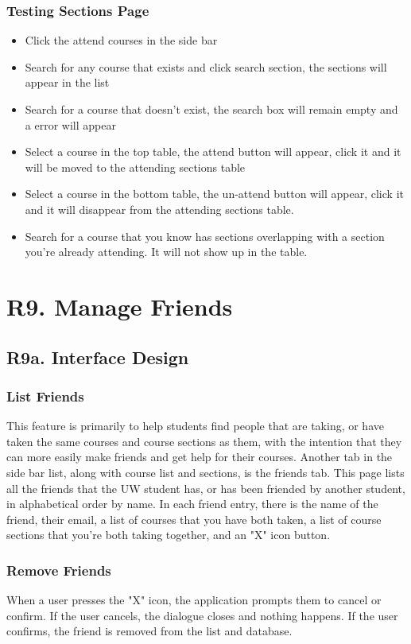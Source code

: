 \documentclass[12pt, a4paper]{article}
\begin{document}
\subsubsection*{Testing Sections Page}
\begin{itemize}
    \item Click the attend courses in the side bar
    \item Search for any course that exists and click search section, the sections will appear in the list
    \item Search for a course that doesn't exist, the search box will remain empty and a error will appear
    \item Select a course in the top table, the attend button will appear, click it and it will be moved to the attending sections table
    \item Select a course in the bottom table, the un-attend button will appear, click it and it will disappear from the attending sections table.
    \item Search for a course that you know has sections overlapping with a section you're already attending. It will not show up in the table.
\end{itemize}
\section*{R9. Manage Friends}
\label{sec:R9}
\subsection*{R9a. Interface Design}
\subsubsection*{List Friends}
This feature is primarily to help students find people that are taking, or have taken the same courses and course sections as them, with the intention that they can more easily make friends and get help for their courses. Another tab in the side bar list, along with course list and sections, is the friends tab. This page lists all the friends that the UW student has, or has been friended by another student, in alphabetical order by name. In each friend entry, there is the name of the friend, their email, a list of courses that you have both taken, a list of course sections that you're both taking together, and an "X" icon button. 
\subsubsection*{Remove Friends}
When a user presses the "X" icon, the application prompts them to cancel or confirm. If the user cancels, the dialogue closes and nothing happens. If the user confirms, the friend is removed from the list and database. 
\end{document}
